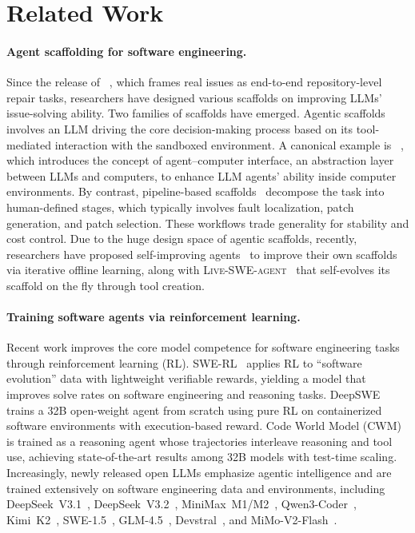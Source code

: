 \section{Related Work}
\label{section:related-work}
\paragraph{Agent scaffolding for software engineering.}
Since the release of \swebench~\cite{swebench}, which frames real \github issues as end-to-end repository-level repair tasks, researchers have designed various scaffolds on improving LLMs' issue-solving ability. Two families of scaffolds have emerged. Agentic scaffolds~\cite{yang2024sweagent,wang2024openhands} involves an LLM driving the core decision-making process based on its tool-mediated interaction with the sandboxed environment. A canonical example is \sweagent~\cite{yang2024sweagent}, which introduces the concept of agent–computer interface, an abstraction layer between LLMs and computers, to enhance LLM agents' ability inside computer environments. By contrast, pipeline-based scaffolds~\cite{xia2024agentless,moatless} decompose the task into human-defined stages, which typically involves fault localization, patch generation, and patch selection. These workflows trade generality for stability and cost control.
Due to the huge design space of agentic scaffolds, recently, researchers have proposed self-improving agents~\cite{zhang2025darwin,wang2025huxley} to improve their own scaffolds via iterative offline learning, along with \textsc{Live-SWE-agent}~\cite{xia2025livesweagentsoftwareengineeringagents} that self-evolves its scaffold on the fly through tool creation.


\paragraph{Training software agents via reinforcement learning.}
Recent work improves the core model competence for software engineering tasks through reinforcement learning (RL). SWE-RL~\cite{wei2025swerl} applies RL to ``software evolution'' data with lightweight verifiable rewards, yielding a model that improves solve rates on software engineering and reasoning tasks. DeepSWE~\cite{deepswe2025} trains a 32B open-weight agent from scratch using pure RL on containerized software environments with execution-based reward. Code World Model (CWM)~\cite{faircodegenteam2025cwmopenweightsllmresearch} is trained as a reasoning agent whose trajectories interleave reasoning and tool use, achieving state-of-the-art results among 32B models with test-time scaling.
Increasingly, newly released open LLMs emphasize agentic intelligence and are trained extensively on software engineering data and environments, including
DeepSeek~V3.1~\cite{deepseekv31}, DeepSeek~V3.2~\cite{deepseekai2025deepseekv32pushingfrontieropen},
MiniMax~M1/M2~\cite{chen2025minimax},
Qwen3-Coder~\cite{qwen3technicalreport},
Kimi~K2~\cite{kimiteam2025kimik2openagentic},
SWE-1.5~\cite{swe15},
GLM-4.5~\cite{5team2025glm45agenticreasoningcoding},
Devstral~\cite{devstral},
and MiMo-V2-Flash~\cite{mimo2025flash}.

